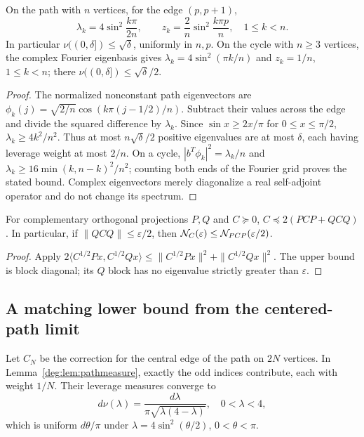 \begin{lemma}\label{deg:lem:pathmeasure}
On the path with $n$ vertices, for the edge $(p,p+1)$,
\[
 \lambda_k=4\sin^2\frac{k\pi}{2n},\qquad
 z_k=\frac2n\sin^2\frac{k\pi p}{n},\quad 1\le k<n.
\]
In particular $\nu((0,\delta])\le\sqrt\delta$, uniformly in $n,p$.
On the cycle with $n\ge3$ vertices, the complex Fourier eigenbasis gives
$\lambda_k=4\sin^2(\pi k/n)$ and $z_k=1/n$, $1\le k<n$;
there $\nu((0,\delta])\le\sqrt\delta/2$.
\end{lemma}
\begin{proof}
The normalized nonconstant path eigenvectors are
$\phi_k(j)=\sqrt{2/n}\cos(k\pi(j-1/2)/n)$.
Subtract their values across the edge and divide the squared difference
by $\lambda_k$. Since $\sin x\ge2x/\pi$ for $0\le x\le\pi/2$,
$\lambda_k\ge4k^2/n^2$. Thus at most $n\sqrt\delta/2$
positive eigenvalues are at most $\delta$, each having leverage weight
at most $2/n$. On a cycle,
$|b^T\phi_k|^2=\lambda_k/n$ and
$\lambda_k\ge16\min(k,n-k)^2/n^2$; counting both ends of the
Fourier grid proves the stated bound. Complex eigenvectors merely
diagonalize a real self-adjoint operator and do not change its spectrum.
\end{proof}

\begin{lemma}\label{deg:lem:pinch}
For complementary orthogonal projections $P,Q$ and $C\succeq0$,
$C\preceq2(PCP+QCQ)$. In particular, if
$\|QCQ\|\le\varepsilon/2$, then
$\mathcal N_C(\varepsilon)\le\mathcal N_{PCP}(\varepsilon/2)$.
\end{lemma}
\begin{proof}
Apply $2\langle C^{1/2}Px,C^{1/2}Qx\rangle
\le\|C^{1/2}Px\|^2+\|C^{1/2}Qx\|^2$.
The upper bound is block diagonal; its $Q$ block has no eigenvalue
strictly greater than $\varepsilon$.
\end{proof}



\subsection{A matching lower bound from the centered-path limit}
Let $C_N$ be the correction for the central edge of the path on $2N$
vertices. In Lemma~\ref{deg:lem:pathmeasure}, exactly the odd indices
contribute, each with weight $1/N$. Their leverage measures converge to
\begin{equation}\label{deg:eq:arcsine}
 d\nu(\lambda)=\frac{d\lambda}{\pi\sqrt{\lambda(4-\lambda)}},\quad
 0<\lambda<4,
\end{equation}
which is uniform $d\theta/\pi$ under
$\lambda=4\sin^2(\theta/2)$, $0<\theta<\pi$.

